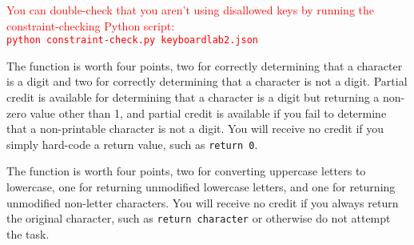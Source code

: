 \textcolor{red}{
You can double-check that you aren't using disallowed keys by running the constraint-checking Python script: \\
\texttt{python constraint-check.py keyboardlab2.json}
}

The  function is worth four points, two for correctly determining that a character is a digit and two for correctly determining that a character is not a digit.
Partial credit is available for determining that a character is a digit but returning a non-zero value other than 1, and partial credit is available if you fail to determine that a non-printable character is not a digit.
You will receive no credit if you simply hard-code a return value, such as \lstinline{return 0}.

The  function is worth four points, two for converting uppercase letters to lowercase, one for returning unmodified lowercase letters, and one for returning unmodified non-letter characters.
You will receive no credit if you always return the original character, such as \lstinline{return character} or otherwise do not attempt the task.
